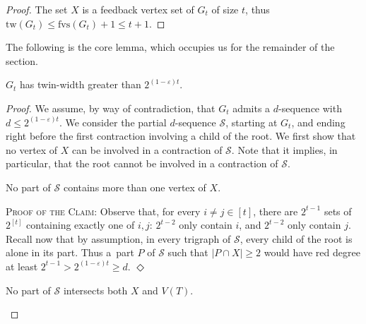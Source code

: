 \documentclass[a4paper,UKenglish,cleveref,hyperref,autoref]{lipics-v2021}
\renewcommand{\geq}{\geqslant}
\renewcommand{\leq}{\leqslant}
\newenvironment{proofofclaim}{\noindent \textsc{Proof of the Claim:}}{\hfill$\Diamond$\medskip}
\newcommand{\tw}{\text{tw}}
\newcommand{\fvs}{\text{fvs}}
\begin{document}
\begin{proof}\label{lem:tw}
  The set $X$ is a feedback vertex set of $G_t$ of size $t$, thus $\tw(G_t) \leqslant \fvs(G_t)+1 \leqslant t+1$. 
\end{proof}

The following is the core lemma, which occupies us for the remainder of the section.
  \begin{lemma}\label{lem:tww}
   $G_t$ has twin-width greater than $2^{(1-\varepsilon)t}$.
  \end{lemma}

  \begin{proof}
  We assume, by way of contradiction, that $G_t$ admits a $d$-sequence with $d \leq 2^{(1-\varepsilon) t}$.
  We consider the partial $d$-sequence $\mathcal S$, starting at $G_t$, and ending right before the first contraction involving a child of the root.
  We first show that no vertex of $X$ can be involved in a contraction of $\mathcal S$.
  Note that it implies, in particular, that the root cannot be involved in a contraction of $\mathcal S$.
  
  \begin{claim}\label{clm:X}
   No part of $\mathcal S$ contains more than one vertex of $X$. 
  \end{claim}
  
  \begin{proofofclaim}
    Observe that, for every $i \neq j \in [t]$, there are $2^{t-1}$ sets of $2^{[t]}$ containing exactly one of $i, j$: $2^{t-2}$ only contain $i$, and $2^{t-2}$ only contain $j$.
    Recall now that by assumption, in every trigraph of $\mathcal S$, every child of the root is alone in its part.
    Thus a~part $P$ of $\mathcal S$ such that $|P \cap X| \geq 2$ would have red degree at least $2^{t-1} > 2^{(1-\varepsilon) t} \geq d$. 
  \end{proofofclaim}

  \begin{claim}\label{clm:X-T}
    No part of $\mathcal S$ intersects both $X$ and $V(T)$.
  \end{claim}
  

\end{proof}
\end{document}

